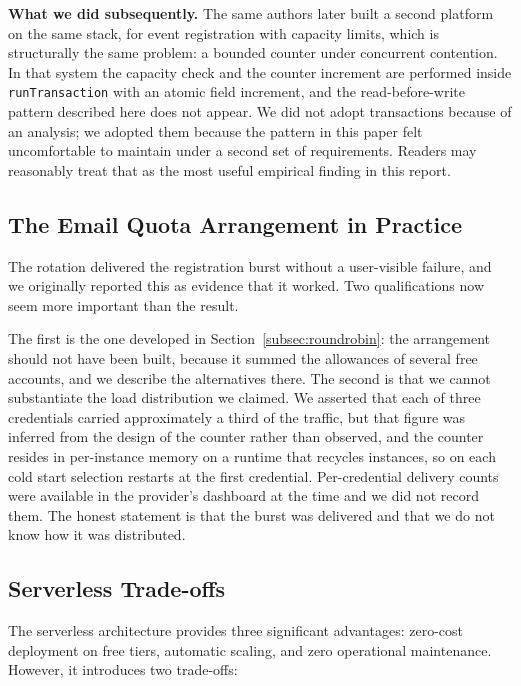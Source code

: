 \documentclass[11pt,a4paper]{article}
\theoremstyle{plain}
\theoremstyle{definition}
\theoremstyle{remark}
\begin{document}
\textbf{What we did subsequently.} The same authors later built a second platform on the same stack, for event registration with capacity limits, which is structurally the same problem: a bounded counter under concurrent contention. In that system the capacity check and the counter increment are performed inside \texttt{runTransaction} with an atomic field increment, and the read-before-write pattern described here does not appear. We did not adopt transactions because of an analysis; we adopted them because the pattern in this paper felt uncomfortable to maintain under a second set of requirements. Readers may reasonably treat that as the most useful empirical finding in this report.

\subsection{The Email Quota Arrangement in Practice}

The rotation delivered the registration burst without a user-visible failure, and we originally reported this as evidence that it worked. Two qualifications now seem more important than the result.

The first is the one developed in Section~\ref{subsec:roundrobin}: the arrangement should not have been built, because it summed the allowances of several free accounts, and we describe the alternatives there. The second is that we cannot substantiate the load distribution we claimed. We asserted that each of three credentials carried approximately a third of the traffic, but that figure was inferred from the design of the counter rather than observed, and the counter resides in per-instance memory on a runtime that recycles instances, so on each cold start selection restarts at the first credential. Per-credential delivery counts were available in the provider's dashboard at the time and we did not record them. The honest statement is that the burst was delivered and that we do not know how it was distributed.

\subsection{Serverless Trade-offs}

The serverless architecture provides three significant advantages: zero-cost deployment on free tiers, automatic scaling, and zero operational maintenance. However, it introduces two trade-offs:
\end{document}
